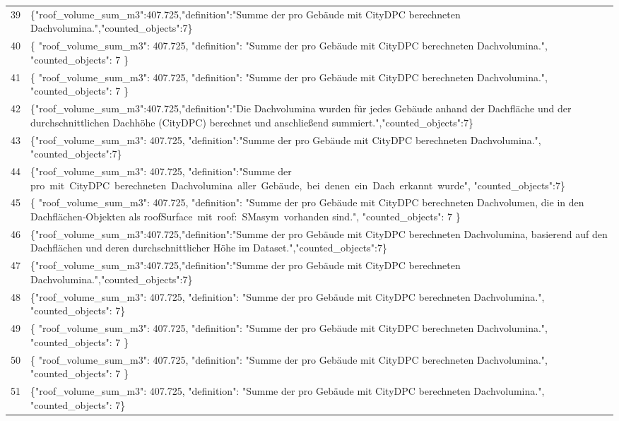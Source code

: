 \documentclass[a4paper,11pt]{article}
\begin{document}
\begin{table}[ht]
\begin{tabular}{r p{12cm}}
39 & \{"roof\_volume\_sum\_m3":407.725,"definition":"Summe der pro Gebäude mit CityDPC berechneten Dachvolumina.","counted\_objects":7\} \\
40 & \{
  "roof\_volume\_sum\_m3": 407.725,
  "definition": "Summe der pro Gebäude mit CityDPC berechneten Dachvolumina.",
  "counted\_objects": 7
\} \\
41 & \{
  "roof\_volume\_sum\_m3": 407.725,
  "definition": "Summe der pro Gebäude mit CityDPC berechneten Dachvolumina.",
  "counted\_objects": 7
\} \\
42 & \{"roof\_volume\_sum\_m3":407.725,"definition":"Die Dachvolumina wurden für jedes Gebäude anhand der Dachfläche und der durchschnittlichen Dachhöhe (CityDPC) berechnet und anschließend summiert.","counted\_objects":7\} \\
43 & \{"roof\_volume\_sum\_m3": 407.725, "definition":"Summe der pro Gebäude mit CityDPC berechneten Dachvolumina.", "counted\_objects":7\} \\
44 & \{"roof\_volume\_sum\_m3": 407.725, "definition":"Summe der pro mit CityDPC berechneten Dachvolumina aller Gebäude, bei denen ein Dach erkannt wurde", "counted\_objects":7\} \\
45 & \{
  "roof\_volume\_sum\_m3": 407.725,
  "definition": "Summe der pro Gebäude mit CityDPC berechnet­en Dachvolumen, die in den Dachflächen‑Objekten als roofSurface mit roof: SMasym vorhanden sind.",
  "counted\_objects": 7
\} \\
46 & \{"roof\_volume\_sum\_m3":407.725,"definition":"Summe der pro Gebäude mit CityDPC berechneten Dachvolumina, basierend auf den Dachflächen und deren durchschnittlicher Höhe im Dataset.","counted\_objects":7\} \\
47 & \{"roof\_volume\_sum\_m3":407.725,"definition":"Summe der pro Gebäude mit CityDPC berechneten Dachvolumina.","counted\_objects":7\} \\
48 & \{"roof\_volume\_sum\_m3": 407.725, "definition": "Summe der pro Gebäude mit CityDPC berechneten Dachvolumina.", "counted\_objects": 7\} \\
49 & \{
  "roof\_volume\_sum\_m3": 407.725,
  "definition": "Summe der pro Gebäude mit CityDPC berechneten Dachvolumina.",
  "counted\_objects": 7
\} \\
50 & \{
  "roof\_volume\_sum\_m3": 407.725,
  "definition": "Summe der pro Gebäude mit CityDPC berechneten Dachvolumina.",
  "counted\_objects": 7
\} \\
51 & \{"roof\_volume\_sum\_m3": 407.725, "definition": "Summe der pro Gebäude mit CityDPC berechneten Dachvolumina.", "counted\_objects": 7\} \\

\end{tabular}
\end{table}
\end{document}

